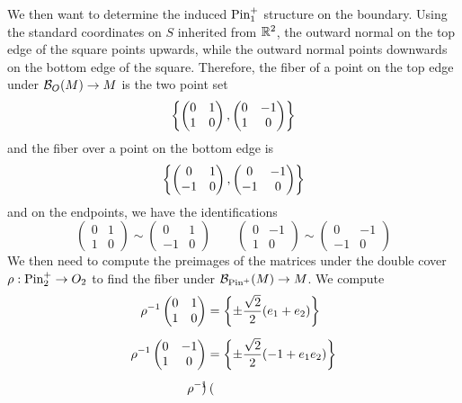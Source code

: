 \begin{exmp}
We then want to determine the induced $\mathrm{Pin}_1^+$ structure on the boundary.
Using the standard coordinates on $S$ inherited from $\mathbb{R}^2$, the outward normal
on the top edge of the square points upwards, while the outward normal points
downwards on the bottom edge of the square. Therefore, the fiber of a point
on the top edge under $\mathcal{B}_O(M) \to M$ is the two point set
\[
\left\lbrace \begin{pmatrix}
0 & 1 \\
1 & 0
\end{pmatrix}, \begin{pmatrix}
0 & -1 \\
1 & 0
\end{pmatrix} \right\rbrace
\]
and the fiber over a point on the bottom edge is
\[
\left\lbrace \begin{pmatrix}
0 & 1 \\
-1 & 0
\end{pmatrix}, \begin{pmatrix}
0 & -1 \\
-1 & 0
\end{pmatrix} \right\rbrace
\]
and on the endpoints, we have the identifications
\[
\begin{pmatrix}
0 & 1 \\
1 & 0
\end{pmatrix} \sim \begin{pmatrix}
0 & 1 \\
-1 & 0
\end{pmatrix} \qquad \begin{pmatrix}
0 & -1 \\
1 & 0
\end{pmatrix} \sim \begin{pmatrix}
0 & -1 \\
-1 & 0
\end{pmatrix}
\]
We then need to compute the preimages of the matrices under the double cover
$\rho : \mathrm{Pin}_2^+ \to O_2$ to find the fiber under $\mathcal{B}_{\mathrm{Pin}^+}(M) \to M$. We
compute
%
\begin{align*}
\rho^{-1}\begin{pmatrix}
0 & 1 \\
1 & 0
\end{pmatrix} &= \left\lbrace \pm \frac{\sqrt{2}}{2}(e_1 + e_2) \right\rbrace \\[5pt]
\rho^{-1}\begin{pmatrix}
0 & -1 \\
1 & 0
\end{pmatrix} &= \left\lbrace \pm\frac{\sqrt{2}}{2}(-1 + e_1e_2) \right\rbrace \\[5pt]
\rho^{-1}\begin{pmatrix}

\end{pmatrix}
\end{align*}
\end{exmp}
